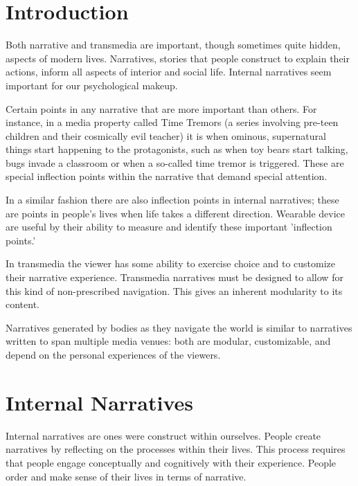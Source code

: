 \documentclass{SIGCHI2015LaTex/sigchi}
\begin{document}


\section{Introduction}


Both narrative and transmedia are important, though sometimes quite hidden, aspects of modern lives. Narratives, stories that people construct to explain their actions, inform all aspects of interior and social life. Internal narratives seem important for our psychological makeup. 

Certain points in any narrative that are more important than others. For instance, in a media property called Time Tremors (a series involving pre-teen children and their cosmically evil teacher) it is when ominous, supernatural things start happening to the protagonists, such as when toy bears start talking, bugs invade a classroom or when a so-called time tremor is triggered. These are special inflection points within the narrative that demand special attention. 

In a similar fashion there are also inflection points in internal narratives; these are points in people's lives when life takes a different direction. Wearable device are useful by their ability to measure and identify these important 'inflection points.'

In transmedia the viewer has some ability to exercise choice and to customize their narrative experience. Transmedia narratives must be designed to allow for this kind of non-prescribed navigation. This gives an inherent modularity to its content.

Narratives generated by bodies as they navigate the world is similar to narratives written to span multiple media venues: both are modular, customizable, and depend on the personal experiences of the viewers. 


\section{Internal Narratives}



Internal narratives are ones were construct within ourselves. People create narratives by reflecting on the processes within their lives. This process requires that people engage conceptually and cognitively with their experience. People order and make sense of their lives in terms of narrative.
\end{document}
